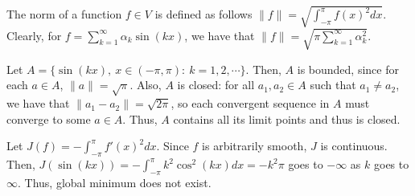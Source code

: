 \documentclass[11pt]{report}
\begin{document}
\noindent The norm of a function $f \in V$ is defined as follows $\|f\| = \sqrt{\int_{-\pi}^{\pi} f(x)^2 dx}$. Clearly, for $f=\sum_{k=1}^{\infty}\alpha_k \sin(kx)$, we have that $\|f\| = \sqrt{\pi \sum_{k=1}^{\infty} \alpha_k^2}$.

\noindent Let $A = \{\sin(kx),~x \in (-\pi,\pi):~k=1,2,\cdots\}$. Then, $A$ is bounded, since for each $a \in A$, $\|a\| = \sqrt{\pi}$. Also, $A$ is closed: for all $a_1, a_2 \in A$ such that $a_1 \neq a_2$, we have that $\|a_1 - a_2\| = \sqrt{2\pi}$, so each convergent sequence in $A$ must converge to some $a \in A$. Thus, $A$ contains all its limit points and thus is closed.

\noindent Let $J(f) = -\int_{-\pi}^{\pi}f'(x)^2 dx$. Since $f$ is arbitrarily smooth, $J$ is continuous. Then, $J(\sin(kx)) = -\int_{-\pi}^{\pi} k^2 \cos^2(kx) dx = -k^2 \pi$ goes to $-\infty$ as $k$ goes to $\infty$. Thus, global minimum does not exist.
\end{document}
